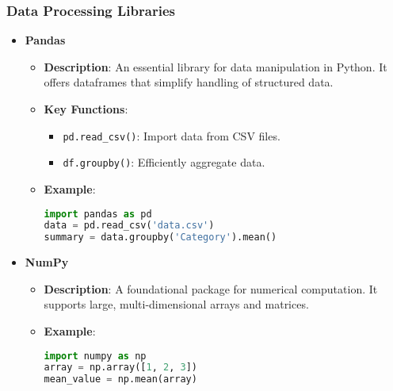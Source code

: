 \documentclass[aspectratio=169]{beamer}
\begin{document}
\begin{frame}[fragile]
    \frametitle{Data Processing Libraries}
    \begin{itemize}
        \item \textbf{Pandas}
        \begin{itemize}
            \item \textbf{Description}: An essential library for data manipulation in Python. It offers dataframes that simplify handling of structured data.
            \item \textbf{Key Functions}:
            \begin{itemize}
                \item \texttt{pd.read\_csv()}: Import data from CSV files.
                \item \texttt{df.groupby()}: Efficiently aggregate data.
            \end{itemize}
            \item \textbf{Example}:
            \begin{lstlisting}[language=Python]
import pandas as pd
data = pd.read_csv('data.csv')
summary = data.groupby('Category').mean()
            \end{lstlisting}
        \end{itemize}

        \item \textbf{NumPy}
        \begin{itemize}
            \item \textbf{Description}: A foundational package for numerical computation. It supports large, multi-dimensional arrays and matrices.
            \item \textbf{Example}:
            \begin{lstlisting}[language=Python]
import numpy as np
array = np.array([1, 2, 3])
mean_value = np.mean(array)
            \end{lstlisting}
        \end{itemize}
    \end{itemize}
\end{frame}
\end{document}
